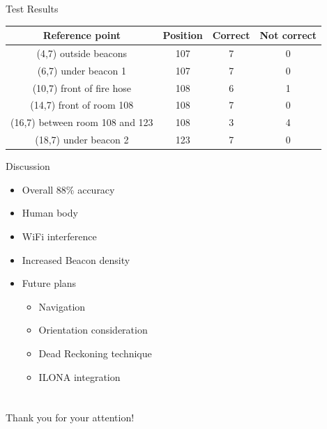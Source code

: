 \documentclass{beamer}
\begin{document}
\begin{frame}[fragile]{Test Results}

	\begin{minipage}{1\textwidth}
		\begin{table}[h]
			\centering
			\begin{tabular}{|c|c|c|c|}
				\hline
				Reference point & Position & Correct & Not correct\\ 
				\hline 
				(4,7) outside beacons & 107 & 7 & 0 \\ \hline
				(6,7) under beacon 1 & 107 & 7 & 0 \\ \hline
				(10,7) front of fire hose & 108 & 6 & 1 \\ \hline
				(14,7) front of room 108 & 108 & 7 & 0 \\ \hline
				(16,7) between room 108 and 123 & 108 & 3 & 4 \\ \hline
				(18,7) under beacon 2 & 123 & 7 & 0\\ \hline
				
			\end{tabular}
		\end{table}
	\end{minipage}
\end{frame}

\begin{frame}[fragile]{Discussion}
	\begin{minipage}{0.39\textwidth}
		\begin{itemize}
			\item Overall 88\% accuracy
			\item Human body
			\item WiFi interference
			\item Increased Beacon density
		\end{itemize}
	\end{minipage}
	\begin{minipage}{0.59\textwidth}
		\begin{itemize}
			\item Future plans
			\begin{itemize}
				\item Navigation
				\item Orientation consideration
				\item Dead Reckoning technique 
				\item ILONA integration
			\end{itemize}
		\end{itemize}
	\end{minipage}
\end{frame}




\section{}
\begin{frame}
\centering
\LARGE Thank you for your attention!
\end{frame}
\end{document}
